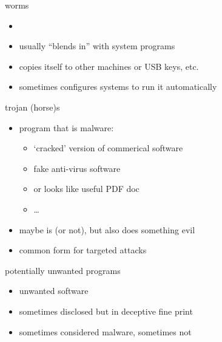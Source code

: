 \begin{frame}{worms}
    \begin{itemize}
    \item {}
    \item usually ``blends in'' with system programs
    \item copies itself to other machines or USB keys, etc.
    \item sometimes configures systems to run it automatically
    \end{itemize}
\end{frame}

\begin{frame}{trojan (horse)s}
    \begin{itemize}
    \item {} program that is malware:
        \begin{itemize}
        \item `cracked' version of commerical software
        \item fake anti-virus software
        \item or looks like useful PDF doc
        \item \ldots
        \end{itemize}
    \item maybe is (or not), but also does something evil
    \item common form for targeted attacks
    \end{itemize}
\end{frame}

\begin{frame}{potentially unwanted programs}
    \begin{itemize}
    \item unwanted software 
    \item sometimes disclosed but in deceptive fine print
    \item sometimes considered malware, sometimes not
    \end{itemize}
\end{frame}

